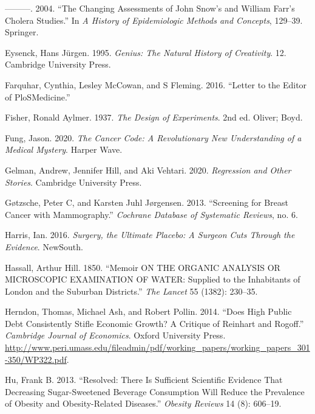\documentclass[
  10ptls,
  b5paper]{book}
\newlength{\cslhangindent}
\newlength{\cslentryspacingunit} %
\newenvironment{CSLReferences}[2] %
 {%
  \setlength{\parindent}{0pt}
  \ifodd #1
  \let\oldpar\par
  \def\par{\hangindent=\cslhangindent\oldpar}
  \fi
  \setlength{\parskip}{#2\cslentryspacingunit}
 }%
 {}
\begin{document}
\begin{CSLReferences}{1}{0}
\leavevmode{}%
---------. 2004. {``The Changing Assessments of John Snow's and William Farr's Cholera Studies.''} In \emph{A History of Epidemiologic Methods and Concepts}, 129--39. Springer.

\leavevmode{}%
Eysenck, Hans Jürgen. 1995. \emph{Genius: The Natural History of Creativity}. 12. Cambridge University Press.

\leavevmode{}%
Farquhar, Cynthia, Lesley McCowan, and S Fleming. 2016. {``Letter to the Editor of PloSMedicine.''}

\leavevmode{}%
Fisher, Ronald Aylmer. 1937. \emph{The Design of Experiments}. 2nd ed. Oliver; Boyd.

\leavevmode{}%
Fung, Jason. 2020. \emph{The Cancer Code: A Revolutionary New Understanding of a Medical Mystery}. Harper Wave.

\leavevmode{}%
Gelman, Andrew, Jennifer Hill, and Aki Vehtari. 2020. \emph{Regression and Other Stories}. Cambridge University Press.

\leavevmode{}%
Gøtzsche, Peter C, and Karsten Juhl Jørgensen. 2013. {``Screening for Breast Cancer with Mammography.''} \emph{Cochrane Database of Systematic Reviews}, no. 6.

\leavevmode{}%
Harris, Ian. 2016. \emph{Surgery, the Ultimate Placebo: A Surgeon Cuts Through the Evidence}. NewSouth.

\leavevmode{}%
Hassall, Arthur Hill. 1850. {``Memoir ON THE ORGANIC ANALYSIS OR MICROSCOPIC EXAMINATION OF WATER: Supplied to the Inhabitants of London and the Suburban Districts.''} \emph{The Lancet} 55 (1382): 230--35.

\leavevmode{}%
Herndon, Thomas, Michael Ash, and Robert Pollin. 2014. {``Does High Public Debt Consistently Stifle Economic Growth? A Critique of Reinhart and Rogoff.''} \emph{Cambridge Journal of Economics}. Oxford University Press. \url{http://www.peri.umass.edu/fileadmin/pdf/working_papers/working_papers_301-350/WP322.pdf}.

\leavevmode{}%
Hu, Frank B. 2013. {``Resolved: There Is Sufficient Scientific Evidence That Decreasing Sugar-Sweetened Beverage Consumption Will Reduce the Prevalence of Obesity and Obesity-Related Diseases.''} \emph{Obesity Reviews} 14 (8): 606--19.


\end{CSLReferences}
\end{document}
